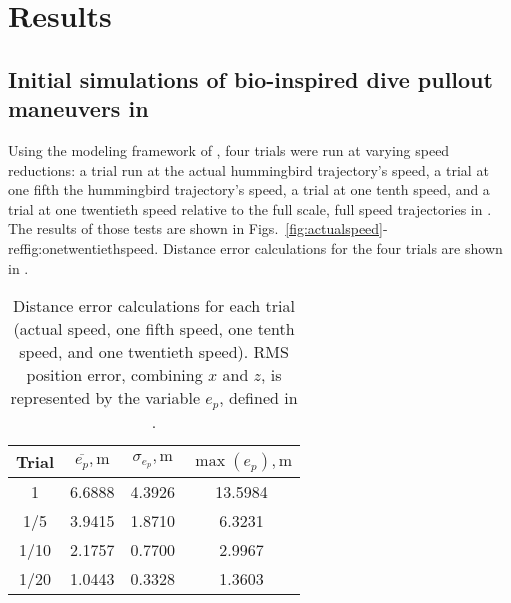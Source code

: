 \section{Results}
\label{sec:results}

\subsection{Initial simulations of bio-inspired dive pullout maneuvers in \Matlab}
Using the modeling framework of \cite{hartman2014quadcopter}, four trials were run at varying speed reductions: a trial run at the actual hummingbird trajectory's speed, a trial at one fifth the hummingbird trajectory's speed, a trial at one tenth speed, and a trial at one twentieth speed relative to the full scale, full speed trajectories in \cite{clark2009courtship}. The results of those tests are shown in Figs.~\ref{fig:actualspeed}-ref{fig:onetwentiethspeed}. Distance error calculations for the four trials are shown in . 
\begin{table}[hb]
\caption{Distance error calculations for each trial (actual speed, one fifth speed, one tenth speed, and one twentieth speed). RMS position error, combining $x$ and $z$, is represented by the variable $e_p$, defined in .}
\label{tab:RMSE}
\begin{center}
\begin{tabular}{cccc}
\toprule
Trial & $\overline{e_p}, \si{\meter}$ & $\sigma_{e_p}, \si{\meter}$ & $\max(e_p), \si{\meter}$  \\ %
\midrule
1 & 6.6888 & 4.3926 & 13.5984 \\
1/5 & 3.9415 & 1.8710 & 6.3231 \\
1/10 & 2.1757 & 0.7700 & 2.9967 \\
1/20 & 1.0443 & 0.3328 & 1.3603 \\
\bottomrule
\end{tabular}
\end{center}
\end{table}

